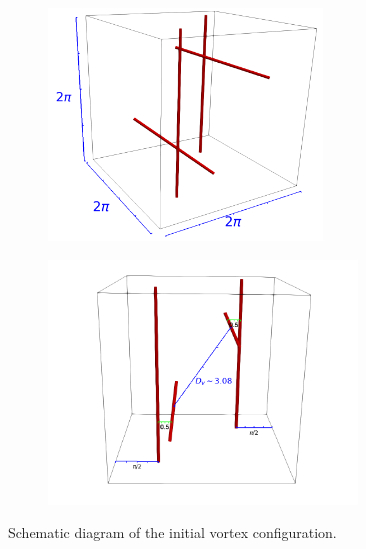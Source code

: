 \documentclass[%
 reprint,
 amsmath,amssymb,
 aps,
 prl,
]{revtex4-2}
\begin{document}
{\begin{figure}
	\centering
	\begin{subfigure}[b]{0.49\textwidth}
		\centering
		\includegraphics[width=0.8\textwidth]{schematic.png}
	\end{subfigure}
	\begin{subfigure}[b]{0.49\textwidth}
		\centering
		\includegraphics[width=0.9\textwidth]{schematic-2.png}
	\end{subfigure}
	\caption{Schematic diagram of the initial vortex configuration.}
	\label{fig:schematic}
\end{figure}

}
\end{document}
